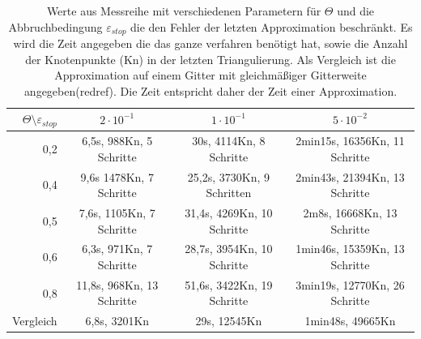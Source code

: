 \begin{table}[!htbp]
	\begin{tabular}{r|c|c|c}
		$\Theta\setminus\varepsilon_{stop}$& $2\cdot10^{-1}$ & $1\cdot10^{-1}$&$5\cdot10^{-2}$ \\
		\hline
		0,2&6,5s, 988Kn, 5 Schritte&30s, 4114Kn, 8 Schritte&2min15s, 16356Kn, 11 Schritte\\	
		0,4&9,6s 1478Kn, 7 Schritte&25,2s, 3730Kn, 9 Schritten&2min43s, 21394Kn,  13 Schritte\\
		0,5&7,6s, 1105Kn, 7 Schritte&31,4s, 4269Kn, 10 Schritte&2m8s, 16668Kn, 13 Schritte\\
		0,6&6,3s, 971Kn, 7 Schritte&28,7s, 3954Kn, 10 Schritte&1min46s, 15359Kn,  13 Schritte\\
		0,8&11,8s, 968Kn, 13 Schritte&51,6s, 3422Kn, 19 Schritte&3min19s, 12770Kn,  26 Schritte\\
		\hline
		Vergleich&6,8s, 3201Kn&29s, 12545Kn&1min48s, 49665Kn\\
	\end{tabular}
	\caption{\label{Test}Werte aus Messreihe mit verschiedenen Parametern für $\Theta$ und die Abbruchbedingung $\varepsilon_{stop}$ die den Fehler der letzten Approximation beschränkt. Es wird die Zeit angegeben die das ganze verfahren benötigt hat, sowie die Anzahl der Knotenpunkte (Kn) in der letzten Triangulierung. Als Vergleich ist die Approximation auf einem Gitter mit gleichmäßiger Gitterweite angegeben(redref). Die Zeit entspricht daher der Zeit einer Approximation.}
\end{table}
